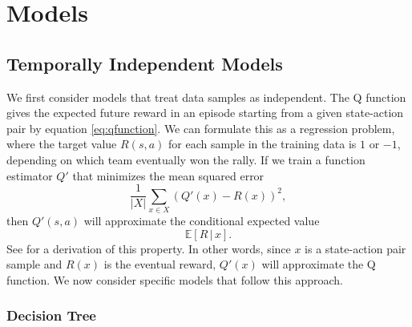 \documentclass{sfuthesis}
\begin{document}
	
	\chapter{Models}
	
	\section{Temporally Independent Models}
	
	We first consider models that treat data samples as independent. The Q function gives the expected future reward in an episode starting from a given state-action pair by equation \eqref{eq:qfunction}. We can formulate this as a regression problem, where the target value $R(s,a)$ for each sample in the training data is $1$ or $-1$, depending on which team eventually won the rally. If we train a function estimator $Q'$ that minimizes the mean squared error
	\begin{equation}
		\frac{1}{|X|}\sum_{x \in X} (Q'(x) - R(x))^2,
		\label{eq:mse}
	\end{equation}
	then $Q'(s,a)$ will approximate the conditional expected value
	$$\mathbb{E} \left[R \, | \, x \right].$$
	See \cite{bishop2006pattern} for a derivation of this property. In other words, since $x$ is a state-action pair sample and $R(x)$ is the eventual reward, $Q'(x)$ will approximate the Q function. We now consider specific models that follow this approach.
	
	\subsection{Decision Tree}
	
\end{document}
